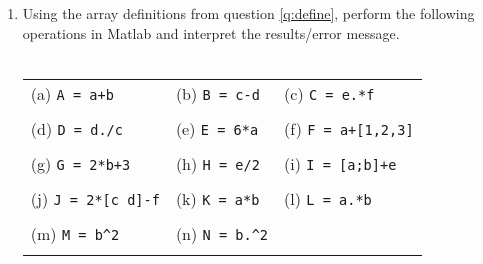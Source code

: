 \documentclass{pass}
\begin{document}
\begin{enumerate}[resume]
\item Using the array definitions from question \ref{q:define}, perform the following operations in Matlab and interpret the results/error message.\\ \\
\begin{tabularx}{\textwidth}{XXX}
(a) \texttt{A = a+b} & (b) \texttt{B = c-d} & (c) \texttt{C = e.*f} \\ \\
(d) \texttt{D = d./c} & (e) \texttt{E = 6*a} & (f) \texttt{F = a+[1,2,3]} \\ \\
(g) \texttt{G = 2*b+3} & (h) \texttt{H = e/2} & (i) \texttt{I = [a;b]+e} \\ \\
(j) \texttt{J = 2*[c d]-f} & (k) \texttt{K = a*b} & (l) \texttt{L = a.*b} \\ \\
(m) \texttt{M = b\^{}2} & (n) \texttt{N = b.\^{}2} &  \\ \\
\end{tabularx}
\end{enumerate}
\end{document}
